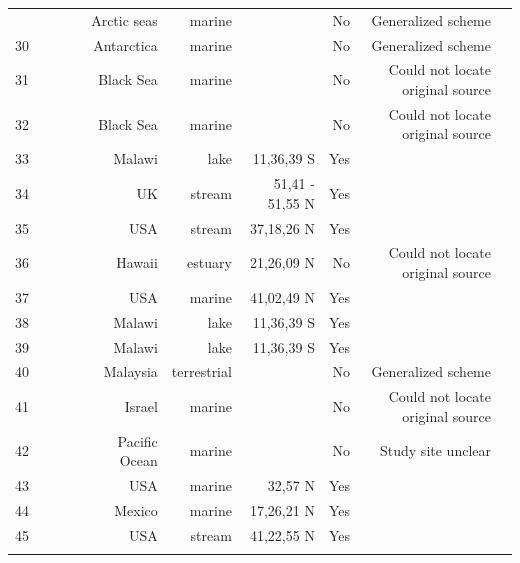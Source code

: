 \documentclass[12pt]{article}
\begin{document}
\begin{landscape}
\begin{table}[h!]
\begin{tabular}{rrrrrrrrr}
{      29    & ~\citet{GlobalWeb} & ~\citet{Dunbar1953} & Arctic seas & marine &       & No    & Generalized scheme &  \\
      30    & ~\citet{GlobalWeb} & ~\citet{Mackintosh1964} & Antarctica & marine &       & No    & Generalized scheme &  \\
      31    & ~\citet{GlobalWeb} & ~\citet{Petipa1970} & Black Sea & marine &       & No    & Could not locate original source &  \\
      32    & ~\citet{GlobalWeb} & ~\citet{Petipa1970} & Black Sea & marine &       & No    & Could not locate original source &  \\
      33    & ~\citet{GlobalWeb} & ~\citet{Fryer1959} & Malawi & lake & 11,36,39 S & Yes   &       &  \\
      34    & ~\citet{GlobalWeb} & ~\citet{Jones1949} & UK    & stream & 51,41 - 51,55 N & Yes   &       &  \\
      35    & ~\citet{GlobalWeb} & ~\citet{Minshall1967} & USA   & stream & 37,18,26 N & Yes   &       &  \\
      36    & ~\citet{GlobalWeb} & ~\citet{Walsh1967} & Hawaii & estuary & 21,26,09 N & No    & Could not locate original source &  \\
      37    & ~\citet{GlobalWeb} & ~\citet{Clarke1967} & USA   & marine & 41,02,49 N & Yes   &       &  \\
      38    & ~\citet{GlobalWeb} & ~\citet{Fryer1959} & Malawi & lake & 11,36,39 S & Yes   &       &  \\
      39    & ~\citet{GlobalWeb} & ~\citet{Fryer1959} & Malawi & lake & 11,36,39 S & Yes   &       &  \\
      40    & ~\citet{GlobalWeb} & ~\citet{Harrison1962} & Malaysia & terrestrial &       & No    & Generalized scheme &  \\
      41    & ~\citet{GlobalWeb} & ~\citet{Parin1970} & Israel & marine &       & No    & Could not locate original source &  \\
      42    & ~\citet{GlobalWeb} & ~\citet{Vinogradov1978} & Pacific Ocean & marine &       & No    & Study site unclear &  \\
      43    & ~\citet{GlobalWeb} & ~\citet{Rosenthal1974} & USA   & marine & 32,57 N & Yes   &       &  \\
      44    & ~\citet{GlobalWeb} & ~\citet{Yanez1978} & Mexico & marine & 17,26,21 N & Yes   &       &  \\
      45    & ~\citet{GlobalWeb} & ~\citet{Tilly1968} & USA   & stream & 41,22,55 N & Yes   &       &  \\
}
\end{tabular}
\end{table}
\end{landscape}
\end{document}
